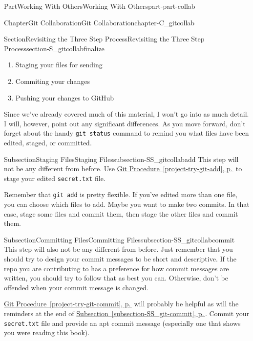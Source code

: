 \documentclass[twoside,10pt,]{book}
\newcommand{\xreffont}{\relax}
\newcommand{\mono}[1]{\texttt{#1}}
\begin{document}
\begin{partptx}{Part}{Working With Others}{}{Working With Others}{}{}{part-part-collab}
\begin{chapterptx}{Chapter}{Git Collaboration}{}{Git Collaboration}{}{}{chapter-C_gitcollab}
\begin{sectionptx}{Section}{Revisiting the Three Step Process}{}{Revisiting the Three Step Process}{}{}{section-S_gitcollabfinalize}
\begin{introduction}{}
\begin{enumerate}
\item{}Staging your files for sending%
\item{}Commiting your changes%
\item{}Pushing your changes to GitHub%
\end{enumerate}
%
\par
Since we've already covered much of this material, I won't go into as much detail. I will, however, point out any significant differences. As you move forward, don't forget about the handy \mono{git status} command to remind you what files have been edited, staged, or committed.%
\end{introduction}%
%
%
\typeout{************************************************}
\typeout{************************************************}
%
\begin{subsectionptx}{Subsection}{Staging Files}{}{Staging Files}{}{}{subsection-SS_gitcollabadd}
%
%
This step will not be any different from before. Use \hyperref[project-try-git-add]{Git Procedure~{\xreffont\ref{project-try-git-add}}, p.\,\pageref{project-try-git-add}} to stage your edited \mono{secret.txt} file.%
\par
Remember that \mono{git add} is pretty flexible. If you've edited more than one file, you can choose which files to add. Maybe you want to make two commits. In that case, stage some files and commit them, then stage the other files and commit them.%
\end{subsectionptx}
%
%
\typeout{************************************************}
\typeout{************************************************}
%
\begin{subsectionptx}{Subsection}{Committing Files}{}{Committing Files}{}{}{subsection-SS_gitcollabcommit}
%
%
This step will also not be any different from before. Just remember that you should try to design your commit messages to be short and descriptive. If the repo you are contributing to has a preference for how commit messages are written, you should try to follow that as best you can. Otherwise, don't be offended when your commit message is changed.%
\par
\hyperref[project-try-git-commit]{Git Procedure~{\xreffont\ref{project-try-git-commit}}, p.\,\pageref{project-try-git-commit}} will probably be helpful as will the reminders at the end of \hyperref[subsection-SS_git-commit]{Subsection~{\xreffont\ref{subsection-SS_git-commit}}, p.\,\pageref{subsection-SS_git-commit}}. Commit your \mono{secret.txt} file and provide an apt commit message (especially one that shows you were reading this book).%

\end{subsectionptx}
\end{sectionptx}
\end{chapterptx}
\end{partptx}
\end{document}
